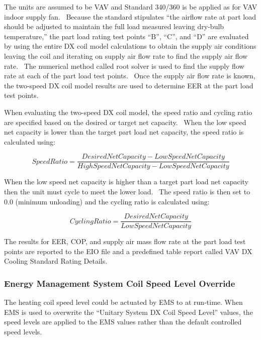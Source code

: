 The units are assumed to be VAV and Standard 340/360 is be applied as for VAV indoor supply fan.~ Because the standard stipulates ``the airflow rate at part load should be adjusted to maintain the full load measured leaving dry-bulb temperature,'' the part load rating test points ``B'', ``C'', and ``D'' are evaluated by using the entire DX coil model calculations to obtain the supply air conditions leaving the coil and iterating on supply air flow rate to find the supply air flow rate.~ The numerical method called root solver is used to find the supply flow rate at each of the part load test points.~ Once the supply air flow rate is known, the two-speed DX coil model results are used to determine EER at the part load test points.

When evaluating the two-speed DX coil model, the speed ratio and cycling ratio are specified based on the desired or target net capacity.~ When the low speed net capacity is lower than the target part load net capacity, the speed ratio is calculated using:

\begin{equation}
SpeedRatio = \frac{{DesiredNetCapacity - LowSpeedNetCapacity}}{{HighSpeedNetCapacity - LowSpeedNetCapacity}}
\end{equation}

When the low speed net capacity is higher than a target part load net capacity then the unit must cycle to meet the lower load.~ The speed ratio is then set to 0.0 (minimum unloading) and the cycling ratio is calculated using:

\begin{equation}
CyclingRatio = \frac{{DesiredNetCapacity}}{{LowSpeedNetCapacity}}
\end{equation}

The results for EER, COP, and supply air mass flow rate at the part load test points are reported to the EIO file and a predefined table report called VAV DX Cooling Standard Rating Details.

\subsubsection{Energy Management System Coil Speed Level Override}\label{energy-management-system-coil-speed-level-override-2}

The heating coil speed level could be actuated by EMS to at run-time. When EMS is used to overwrite the “Unitary System DX Coil Speed Level” values, the speed levels are applied to the EMS values rather than the default controlled speed levels.

